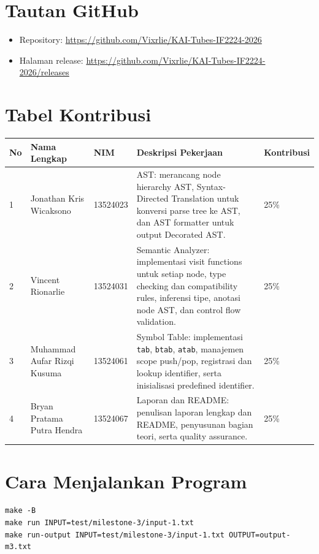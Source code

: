 \section{Tautan GitHub}
\begin{itemize}
    \item Repository: \href{https://github.com/Vixrlie/KAI-Tubes-IF2224-2026}{https://github.com/Vixrlie/KAI-Tubes-IF2224-2026}
    \item Halaman release: \href{https://github.com/Vixrlie/KAI-Tubes-IF2224-2026/releases}{https://github.com/Vixrlie/KAI-Tubes-IF2224-2026/releases}
\end{itemize}

\section{Tabel Kontribusi}
\begin{center}
    \begin{tabularx}{\linewidth}{C{0.8cm} Y C{2.6cm} L C{1.6cm}}
        \toprule
        \textbf{No} & \textbf{Nama Lengkap} & \textbf{NIM} & \textbf{Deskripsi Pekerjaan} & \textbf{Kontribusi} \\
         & Jonathan Kris Wicaksono & 13524023 & AST: merancang node hierarchy AST, Syntax-Directed Translation untuk konversi parse tree ke AST, dan AST formatter untuk output Decorated AST. & 25\% \\
        2 & Vincent Rionarlie & 13524031 & Semantic Analyzer: implementasi visit functions untuk setiap node, type checking dan compatibility rules, inferensi tipe, anotasi node AST, dan control flow validation. & 25\% \\
        3 & Muhammad Aufar Rizqi Kusuma & 13524061 & Symbol Table: implementasi \texttt{tab}, \texttt{btab}, \texttt{atab}, manajemen scope push/pop, registrasi dan lookup identifier, serta inisialisasi predefined identifier. & 25\% \\
        4 & Bryan Pratama Putra Hendra & 13524067 & Laporan dan README: penulisan laporan lengkap dan README, penyusunan bagian teori, serta quality assurance. & 25\% \\
        \bottomrule
    \end{tabularx}
\end{center}

\section{Cara Menjalankan Program}
\begin{lstlisting}[basicstyle=\ttfamily\scriptsize,breaklines=true,frame=single,numbers=none]
make -B
make run INPUT=test/milestone-3/input-1.txt
make run-output INPUT=test/milestone-3/input-1.txt OUTPUT=output-m3.txt
\end{lstlisting}